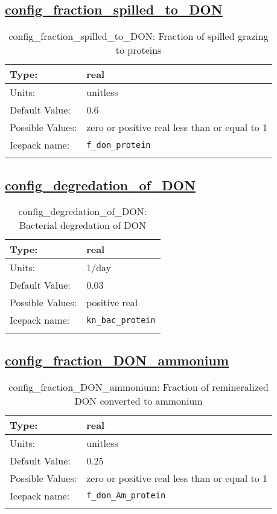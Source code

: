 \subsection[config\_fraction\_spilled\_to\_DON]{\hyperref[sec:nm_tab_biogeochemistry]{config\_fraction\_spilled\_to\_DON}}
\label{subsec:nm_sec_config_fraction_spilled_to_DON}
\begin{center}
\begin{longtable}{| p{2.0in} || p{4.0in} |}
    \hline
    Type: & real \\
    \hline
    Units: & \si{unitless} \\
    \hline
    Default Value: & 0.6 \\
    \hline
    Possible Values: & zero or positive real less than or equal to 1 \\
    \hline
    \hline
    Icepack name: & \verb+f_don_protein+ \\
    \caption{config\_fraction\_spilled\_to\_DON: Fraction of spilled grazing to proteins}
\end{longtable}
\end{center}
\subsection[config\_degredation\_of\_DON]{\hyperref[sec:nm_tab_biogeochemistry]{config\_degredation\_of\_DON}}
\label{subsec:nm_sec_config_degredation_of_DON}
\begin{center}
\begin{longtable}{| p{2.0in} || p{4.0in} |}
    \hline
    Type: & real \\
    \hline
    Units: & \si{1/day} \\
    \hline
    Default Value: & 0.03 \\
    \hline
    Possible Values: & positive real \\
    \hline
    \hline
    Icepack name: & \verb+kn_bac_protein+ \\
    \caption{config\_degredation\_of\_DON: Bacterial degredation of DON}
\end{longtable}
\end{center}
\subsection[config\_fraction\_DON\_ammonium]{\hyperref[sec:nm_tab_biogeochemistry]{config\_fraction\_DON\_ammonium}}
\label{subsec:nm_sec_config_fraction_DON_ammonium}
\begin{center}
\begin{longtable}{| p{2.0in} || p{4.0in} |}
    \hline
    Type: & real \\
    \hline
    Units: & \si{unitless} \\
    \hline
    Default Value: & 0.25 \\
    \hline
    Possible Values: & zero or positive real less than or equal to 1 \\
    \hline
    \hline
    Icepack name: & \verb+f_don_Am_protein+ \\
    \caption{config\_fraction\_DON\_ammonium: Fraction of remineralized DON converted to ammonium}
\end{longtable}
\end{center}
